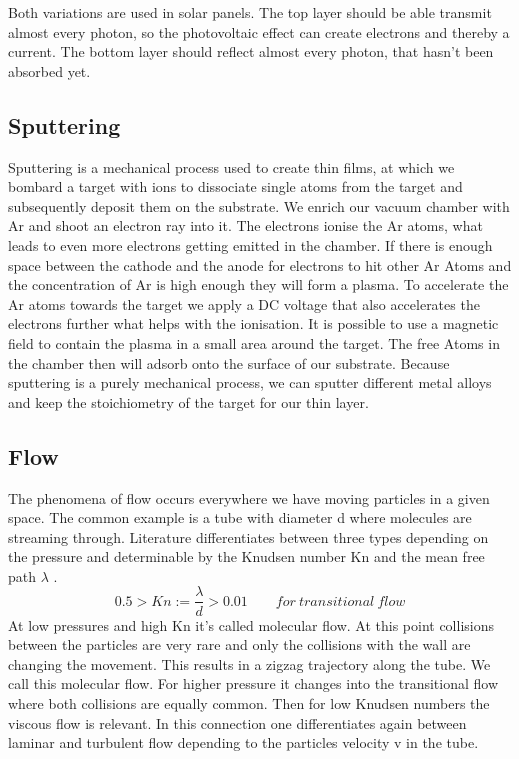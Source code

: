 \documentclass[]{article}
\begin{document}
Both variations are used in solar panels. The top layer should be able transmit almost every photon, so the photovoltaic effect can create electrons and thereby a current. The bottom layer should reflect almost every photon, that hasn't been absorbed yet.

\subsection{Sputtering}
Sputtering is a mechanical process used to create thin films, at which we bombard a target with ions to dissociate single atoms from the target and subsequently deposit them on the substrate. We enrich our vacuum chamber with Ar and shoot an electron ray into it. The electrons ionise the Ar atoms, what leads to even more electrons getting emitted in the chamber. If there is enough space between the cathode and the anode for electrons to hit other Ar Atoms and the concentration of Ar is high enough they will form a plasma. To accelerate the Ar atoms towards the target we apply a DC voltage that also accelerates the electrons further what helps with the ionisation. It is possible to use a magnetic field to contain the plasma in a small area around the target. The free Atoms in the chamber then will adsorb onto the surface of our substrate. Because sputtering is a purely mechanical process, we can sputter different metal alloys and keep the stoichiometry of the target for our thin layer.


\subsection{Flow}
The phenomena of flow occurs everywhere we have moving particles in a given space. The common example is a tube with diameter d where molecules are streaming through. Literature differentiates between three types depending on the pressure and determinable by the Knudsen number Kn and the mean free path $\lambda$ .
\[ 0.5 > Kn := \frac{\lambda}{d} > 0.01 \qquad for\: transitional\: flow\]
At low pressures and high Kn it's called molecular flow. At this point collisions between the particles are very rare and only the collisions with the wall are changing the movement. This results in a zigzag trajectory along the tube. We call this molecular flow. For higher pressure it changes into the transitional flow where both collisions are equally common. Then for low Knudsen numbers the viscous flow is relevant. In this connection one differentiates again between laminar and turbulent flow depending to the particles velocity v in the tube.
\end{document}
